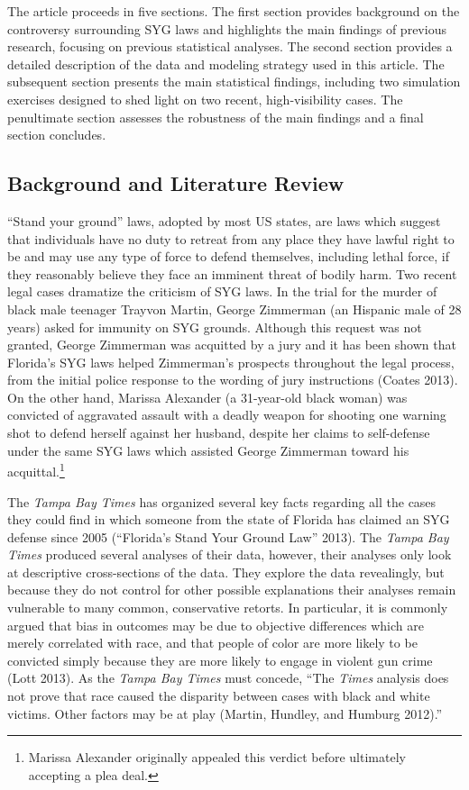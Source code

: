 \documentclass[12pt,article]{article}
\begin{document}
The article proceeds in five sections. The first section provides
background on the controversy surrounding SYG laws and highlights the
main findings of previous research, focusing on previous statistical
analyses. The second section provides a detailed description of the data
and modeling strategy used in this article. The subsequent section
presents the main statistical findings, including two simulation
exercises designed to shed light on two recent, high-visibility cases.
The penultimate section assesses the robustness of the main findings and
a final section concludes.

\subsection{Background and Literature
Review}\label{background-and-literature-review}

``Stand your ground'' laws, adopted by most US states, are laws which
suggest that individuals have no duty to retreat from any place they
have lawful right to be and may use any type of force to defend
themselves, including lethal force, if they reasonably believe they face
an imminent threat of bodily harm. Two recent legal cases dramatize the
criticism of SYG laws. In the trial for the murder of black male
teenager Trayvon Martin, George Zimmerman (an Hispanic male of 28 years)
asked for immunity on SYG grounds. Although this request was not
granted, George Zimmerman was acquitted by a jury and it has been shown
that Florida's SYG laws helped Zimmerman's prospects throughout the
legal process, from the initial police response to the wording of jury
instructions (Coates 2013). On the other hand, Marissa Alexander (a
31-year-old black woman) was convicted of aggravated assault with a
deadly weapon for shooting one warning shot to defend herself against
her husband, despite her claims to self-defense under the same SYG laws
which assisted George Zimmerman toward his acquittal.\footnote{Marissa
  Alexander originally appealed this verdict before ultimately accepting
  a plea deal.}

The \emph{Tampa Bay Times} has organized several key facts regarding all
the cases they could find in which someone from the state of Florida has
claimed an SYG defense since 2005 (``Florida's Stand Your Ground Law''
2013). The \emph{Tampa Bay Times} produced several analyses of their
data, however, their analyses only look at descriptive cross-sections of
the data. They explore the data revealingly, but because they do not
control for other possible explanations their analyses remain vulnerable
to many common, conservative retorts. In particular, it is commonly
argued that bias in outcomes may be due to objective differences which
are merely correlated with race, and that people of color are more
likely to be convicted simply because they are more likely to engage in
violent gun crime (Lott 2013). As the \emph{Tampa Bay Times} must
concede, ``The \emph{Times} analysis does not prove that race caused the
disparity between cases with black and white victims. Other factors may
be at play (Martin, Hundley, and Humburg 2012).''
\end{document}
